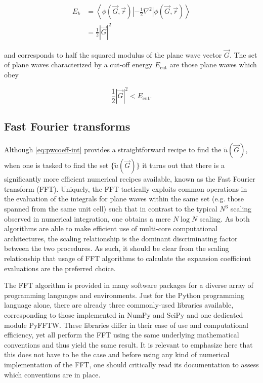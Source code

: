 \begin{align}
    E_{k} &= \left<\phi(\vec{G},\vec{r}) \left| -\frac{1}{2} \nabla^{2} \right|\phi(\vec{G},\vec{r})\right> \\
    &= \frac{1}{2} \left| \vec{G} \right|^{2}
    \label{eq:kin-en_pw}
\end{align}

and corresponds to half the squared modulus of the plane wave vector $\vec{G}$. The set of plane waves characterized by a cut-off energy $E_{\textrm{cut}}$ are those plane waves which obey

\begin{equation}
    \frac{1}{2} \left| \vec{G} \right|^{2} < E_{\textrm{cut}}.
\end{equation}

%
%
%
\subsection{Fast Fourier transforms}

Although \cref{eq:pwcoeff-int} provides a straightforward recipe to find the $\tilde{u}(\vec{G})$, when one is tasked to find the set $\{\tilde{u}(\vec{G})\}$ it turns out that there is a significantly more efficient numerical recipes available, known as the Fast Fourier transform (FFT). Uniquely, the FFT tactically exploits common operations in the evaluation of the integrals for plane waves within the same set (e.g. those spanned from the same unit cell) such that in contrast to the typical $N^{3}$ scaling observed in numerical integration, one obtains a mere $N \log N$ scaling. As both algorithms are able to make efficient use of multi-core computational architectures, the scaling relationship is the dominant discriminating factor between the two procedures. As such, it should be clear from the scaling relationship that usage of FFT algorithms to calculate the expansion coefficient evaluations are the preferred choice.

The FFT algorithm is provided in many software packages for a diverse array of programming languages and environments. Just for the Python programming language alone, there are already three commonly-used libraries available, corresponding to those implemented in NumPy\cite{numpy} and SciPy\cite{scipy} and one dedicated module PyFFTW. These libraries differ in their ease of use and computational efficiency, yet all perform the FFT using the same underlying mathematical conventions and thus yield the same result. It is relevant to emphasize here that this does not have to be the case and before using any kind of numerical implementation of the FFT, one should critically read its documentation to assess which conventions are in place.


